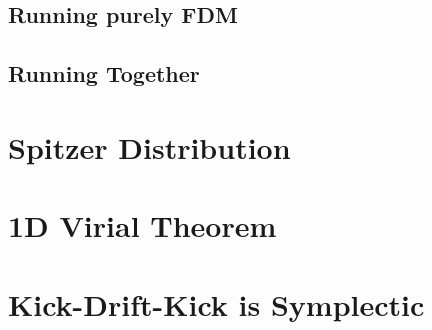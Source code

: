 \documentclass[oneside]{book}
\begin{document}
\section{Running purely FDM}

\section{Running Together}



\appendix
\chapter{Spitzer Distribution}\label{Spitzer+BinneyTremaineProblem}

\chapter{1D Virial Theorem}

\chapter{Kick-Drift-Kick is Symplectic}\label{KDK Symplectic}


\end{document}
